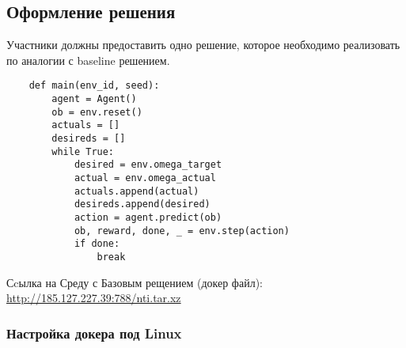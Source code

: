 \subsection*{Оформление решения}

Участники должны предоставить одно решение, которое необходимо реализовать по аналогии с baseline решением.

\begin{verbatim}
    def main(env_id, seed):
        agent = Agent()
        ob = env.reset()
        actuals = []
        desireds = []
        while True:
            desired = env.omega_target
            actual = env.omega_actual
            actuals.append(actual)
            desireds.append(desired)
            action = agent.predict(ob)
            ob, reward, done, _ = env.step(action)
            if done:
                break

\end{verbatim}

Сcылка на Среду с Базовым рещением (докер файл): \url{http://185.127.227.39:788/nti.tar.xz}

\subsubsection*{Настройка докера под Linux}

